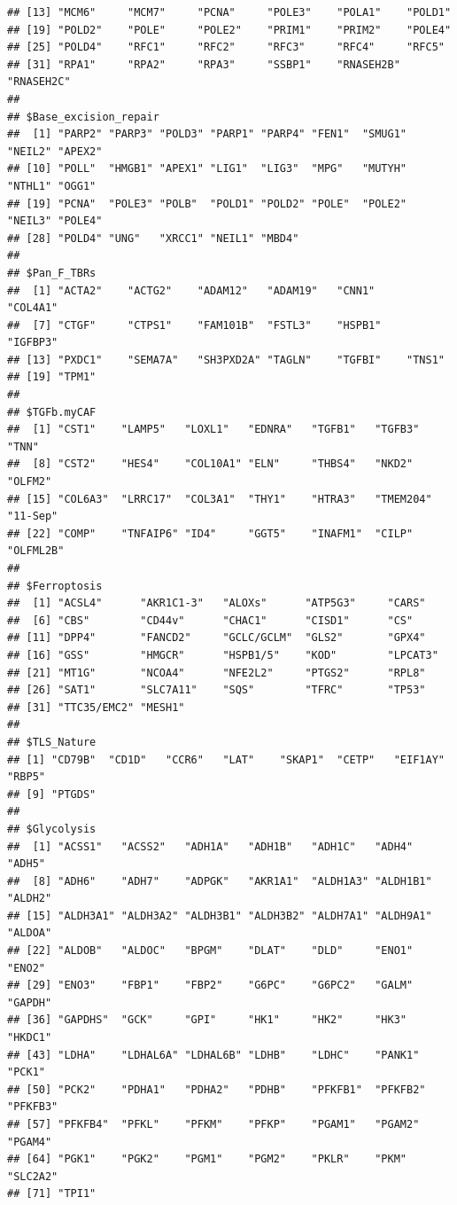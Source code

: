 \documentclass[
  12pt,
]{book}
\begin{document}
\begin{verbatim}
## [13] "MCM6"     "MCM7"     "PCNA"     "POLE3"    "POLA1"    "POLD1"   
## [19] "POLD2"    "POLE"     "POLE2"    "PRIM1"    "PRIM2"    "POLE4"   
## [25] "POLD4"    "RFC1"     "RFC2"     "RFC3"     "RFC4"     "RFC5"    
## [31] "RPA1"     "RPA2"     "RPA3"     "SSBP1"    "RNASEH2B" "RNASEH2C"
## 
## $Base_excision_repair
##  [1] "PARP2" "PARP3" "POLD3" "PARP1" "PARP4" "FEN1"  "SMUG1" "NEIL2" "APEX2"
## [10] "POLL"  "HMGB1" "APEX1" "LIG1"  "LIG3"  "MPG"   "MUTYH" "NTHL1" "OGG1" 
## [19] "PCNA"  "POLE3" "POLB"  "POLD1" "POLD2" "POLE"  "POLE2" "NEIL3" "POLE4"
## [28] "POLD4" "UNG"   "XRCC1" "NEIL1" "MBD4" 
## 
## $Pan_F_TBRs
##  [1] "ACTA2"    "ACTG2"    "ADAM12"   "ADAM19"   "CNN1"     "COL4A1"  
##  [7] "CTGF"     "CTPS1"    "FAM101B"  "FSTL3"    "HSPB1"    "IGFBP3"  
## [13] "PXDC1"    "SEMA7A"   "SH3PXD2A" "TAGLN"    "TGFBI"    "TNS1"    
## [19] "TPM1"    
## 
## $TGFb.myCAF
##  [1] "CST1"    "LAMP5"   "LOXL1"   "EDNRA"   "TGFB1"   "TGFB3"   "TNN"    
##  [8] "CST2"    "HES4"    "COL10A1" "ELN"     "THBS4"   "NKD2"    "OLFM2"  
## [15] "COL6A3"  "LRRC17"  "COL3A1"  "THY1"    "HTRA3"   "TMEM204" "11-Sep" 
## [22] "COMP"    "TNFAIP6" "ID4"     "GGT5"    "INAFM1"  "CILP"    "OLFML2B"
## 
## $Ferroptosis
##  [1] "ACSL4"      "AKR1C1-3"   "ALOXs"      "ATP5G3"     "CARS"      
##  [6] "CBS"        "CD44v"      "CHAC1"      "CISD1"      "CS"        
## [11] "DPP4"       "FANCD2"     "GCLC/GCLM"  "GLS2"       "GPX4"      
## [16] "GSS"        "HMGCR"      "HSPB1/5"    "KOD"        "LPCAT3"    
## [21] "MT1G"       "NCOA4"      "NFE2L2"     "PTGS2"      "RPL8"      
## [26] "SAT1"       "SLC7A11"    "SQS"        "TFRC"       "TP53"      
## [31] "TTC35/EMC2" "MESH1"     
## 
## $TLS_Nature
## [1] "CD79B"  "CD1D"   "CCR6"   "LAT"    "SKAP1"  "CETP"   "EIF1AY" "RBP5"  
## [9] "PTGDS" 
## 
## $Glycolysis
##  [1] "ACSS1"   "ACSS2"   "ADH1A"   "ADH1B"   "ADH1C"   "ADH4"    "ADH5"   
##  [8] "ADH6"    "ADH7"    "ADPGK"   "AKR1A1"  "ALDH1A3" "ALDH1B1" "ALDH2"  
## [15] "ALDH3A1" "ALDH3A2" "ALDH3B1" "ALDH3B2" "ALDH7A1" "ALDH9A1" "ALDOA"  
## [22] "ALDOB"   "ALDOC"   "BPGM"    "DLAT"    "DLD"     "ENO1"    "ENO2"   
## [29] "ENO3"    "FBP1"    "FBP2"    "G6PC"    "G6PC2"   "GALM"    "GAPDH"  
## [36] "GAPDHS"  "GCK"     "GPI"     "HK1"     "HK2"     "HK3"     "HKDC1"  
## [43] "LDHA"    "LDHAL6A" "LDHAL6B" "LDHB"    "LDHC"    "PANK1"   "PCK1"   
## [50] "PCK2"    "PDHA1"   "PDHA2"   "PDHB"    "PFKFB1"  "PFKFB2"  "PFKFB3" 
## [57] "PFKFB4"  "PFKL"    "PFKM"    "PFKP"    "PGAM1"   "PGAM2"   "PGAM4"  
## [64] "PGK1"    "PGK2"    "PGM1"    "PGM2"    "PKLR"    "PKM"     "SLC2A2" 
## [71] "TPI1"
\end{verbatim}
\end{document}
